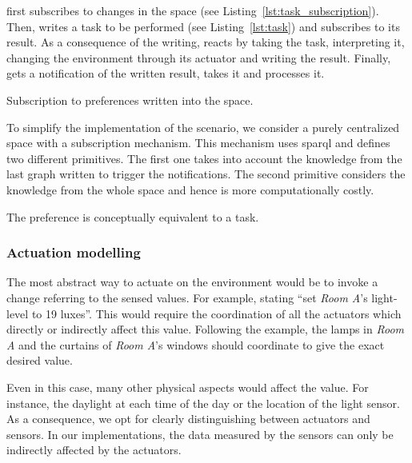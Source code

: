 \nodeProvSpace{} first subscribes to changes in the space (see Listing~\ref{lst:task_subscription}).
Then, \nodeConsSpace{} writes a task to be performed (see Listing~\ref{lst:task}) and subscribes to its result.
As a consequence of the writing, \nodeProvSpace{} reacts by taking the task, interpreting it, changing the environment through its actuator and writing the result.
Finally, \nodeConsSpace{} gets a notification of the written result, takes it and processes it.


\begin{listing}
  
  \caption{Subscription to preferences written into the space.}
  \label{lst:task_subscription}
\end{listing}


To simplify the implementation of the scenario, we consider a purely centralized space with a subscription mechanism.
This mechanism uses \acs{sparql}  and defines two different primitives.
The first one takes into account the knowledge from the last graph written to trigger the notifications.
The second primitive considers the knowledge from the whole space and hence is more computationally costly.


\begin{listing}
  
  \caption{The preference is conceptually equivalent to a task.}
  \label{lst:task}
\end{listing}



\subsubsection{Actuation modelling}

The most abstract way to actuate on the environment would be to invoke a change referring to the sensed values.
For example, stating ``set \emph{Room A}'s light-level to 19 luxes''.
This would require the coordination of all the actuators which directly or indirectly affect this value.
Following the example, the lamps in \emph{Room A} and the curtains of \emph{Room A}'s windows should coordinate to give the exact desired value.


Even in this case, many other physical aspects would affect the value.
For instance, the daylight at each time of the day or the location of the light sensor.
As a consequence, we opt for clearly distinguishing between actuators and sensors.
In our implementations, the data measured by the sensors can only be indirectly affected by the actuators.


